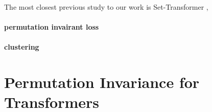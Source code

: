\documentclass{article}
\begin{document}
The most closest previous study to our work is Set-Transformer \cite{lee2019set},
\paragraph{permutation invairant loss}

\paragraph{clustering}


\section{Permutation Invariance for Transformers}



\end{document}
